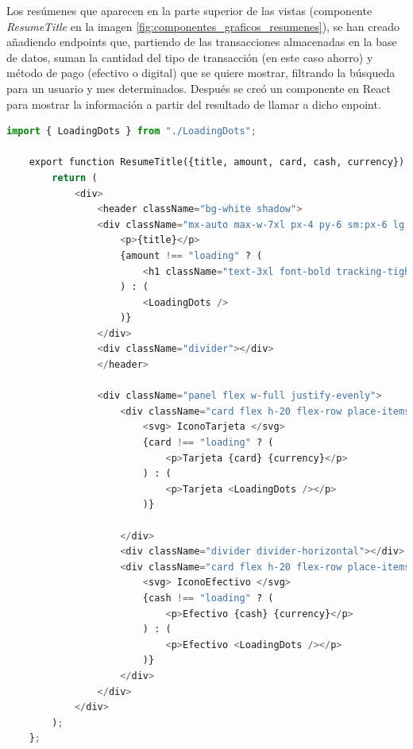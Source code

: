 Los resúmenes que aparecen en la parte superior de las vistas (componente \textit{ResumeTitle} en la imagen \ref{fig:componentes_graficos_resumenes}), se han creado añadiendo endpoints que, partiendo de las transacciones almacenadas en la base de datos, suman la cantidad del tipo de transacción (en este caso ahorro) y método de pago (efectivo o digital) que se quiere mostrar, filtrando la búsqueda para un usuario y mes determinados. Después se creó un componente en React para mostrar la información a partir del resultado de llamar a dicho enpoint.

\begin{lstlisting}[language=Python, caption=Componente de React para el resumen de gastos]
    import { LoadingDots } from "./LoadingDots";

    export function ResumeTitle({title, amount, card, cash, currency}) {
        return (
            <div>
                <header className="bg-white shadow">
                <div className="mx-auto max-w-7xl px-4 py-6 sm:px-6 lg:px-8">
                    <p>{title}</p>
                    {amount !== "loading" ? (
                        <h1 className="text-3xl font-bold tracking-tight text-gray-900">{amount} {currency}</h1>
                    ) : (
                        <LoadingDots />
                    )}
                </div>
                <div className="divider"></div>
                </header>
    
                <div className="panel flex w-full justify-evenly">
                    <div className="card flex h-20 flex-row place-items-center">
                        <svg> IconoTarjeta </svg>
                        {card !== "loading" ? (
                            <p>Tarjeta {card} {currency}</p>
                        ) : (
                            <p>Tarjeta <LoadingDots /></p>
                        )}
                        
                    </div>
                    <div className="divider divider-horizontal"></div>
                    <div className="card flex h-20 flex-row place-items-center">
                        <svg> IconoEfectivo </svg>
                        {cash !== "loading" ? (
                            <p>Efectivo {cash} {currency}</p>
                        ) : (
                            <p>Efectivo <LoadingDots /></p>
                        )}
                    </div>
                </div>
            </div>  
        );
    };
\end{lstlisting}

